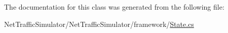 The documentation for this class was generated from the following file\-:\begin{DoxyCompactItemize}
\item 
Net\-Traffic\-Simulator/\-Net\-Traffic\-Simulator/framework/\hyperlink{State_8cs}{State.\-cs}\end{DoxyCompactItemize}
